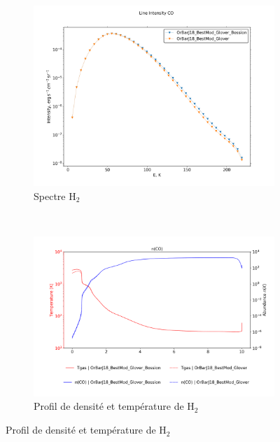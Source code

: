\begin{figure}[h!]
    \centering
    \begin{subfigure}[t]{0.45\textwidth} %
        \centering \includegraphics[trim = {0 0 0 1.5cm},clip,width=1\textwidth]{figure/H2/GloverBossion/I_comp_CO.png}
        \caption{Spectre $\mathrm{H}_2$}
    \end{subfigure}
    ~ 
    \begin{subfigure}[t]{0.45\textwidth}
        \centering \includegraphics[trim = {0 0 0 1.5cm},clip,width=1\textwidth]{figure/H2/GloverBossion/nT_comp_CO.png}
        \caption{Profil de densité et température de $\mathrm{H}_2$}
    \end{subfigure}


\end{figure}
